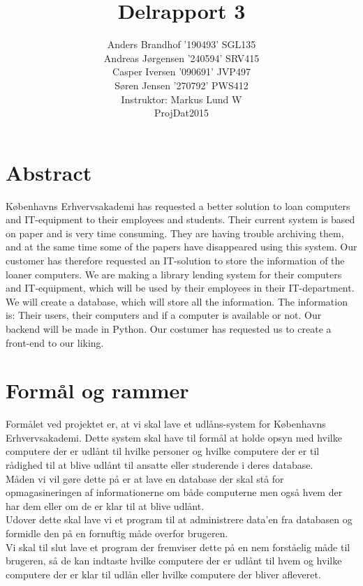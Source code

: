 \documentclass[a4paper]{article}
\title{Delrapport 3}
\author{Anders Brandhof '190493' SGL135 \\ Andreas Jørgensen '240594' SRV415 \\ Casper Iversen '090691' JVP497 \\ Søren Jensen '270792' PWS412 \\
Instruktor: Markus Lund W\\
ProjDat2015}
\begin{document}
\maketitle

\pagebreak

\tableofcontents

\newpage

\section{Abstract}
Københavns Erhvervsakademi has requested a better solution to loan computers and IT-equipment to their employees and students. Their current system is based on paper and is very time consuming. They are having trouble archiving them, and at the same time some of the papers have disappeared using this system. Our customer has therefore requested an IT-solution to store the information of the loaner computers. We are making a library lending system for their computers and IT-equipment, which will be used by their employees in their IT-department. We will create a database, which will store all the information. The information is: Their users, their computers and if a computer is available or not. Our backend will be made in Python. Our costumer has requested us to create a front-end to our liking.
\pagebreak
\section{Formål og rammer}
Formålet ved projektet er, at vi skal lave et udlåns-system for Københavns Erhvervsakademi. Dette system skal have til formål at holde opsyn med hvilke computere der er udlånt til hvilke personer og hvilke computere der er til rådighed til at blive udlånt til ansatte eller studerende i deres database.\\
Måden vi vil gøre dette på er at lave en database der skal stå for opmagasineringen af informationerne om både computerne men også hvem der har dem eller om de er klar til at blive udlånt.\\
Udover dette skal lave vi et program til at administrere data’en fra databasen og formidle den på en fornuftig måde overfor brugeren.\\
Vi skal til slut lave et program der fremviser dette på en nem forståelig måde til brugeren, så de kan indtaste hvilke computere der er udlånt til hvem og hvilke computere der er klar til udlån eller hvilke computere der bliver afleveret.\\ \\
\end{document}
